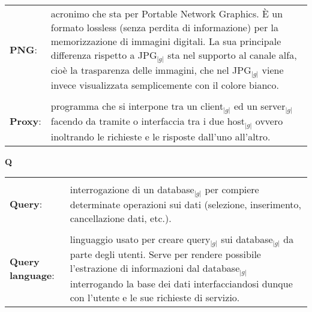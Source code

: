 \begin{longtable}{p{} p{}}
	    \\
	    \textbf{PNG}:		&	acronimo che sta per Portable Network Graphics. \`E un formato lossless (senza perdita di informazione) per la memorizzazione di immagini digitali. La sua principale differenza rispetto a JPG$_{|g|}$ sta 
						nel supporto al canale alfa, cioè la trasparenza delle immagini, che nel JPG$_{|g|}$ viene invece visualizzata semplicemente con il colore bianco.\\
	    \\
	    \textbf{Proxy}: 		&	programma che si interpone tra un client$_{|g|}$ ed un server$_{|g|}$ facendo da tramite o interfaccia tra i due host$_{|g|}$ ovvero inoltrando le richieste e le risposte dall’uno all’altro.\\
	\end{longtable}
\newpage


\hfill\Huge{\textbf{Q}}\\
\normalsize
	\begin{longtable}{p{} p{}} 
	    \toprule
	    \\
	    \textbf{Query}: 		&	interrogazione di un database$_{|g|}$ per compiere determinate operazioni sui dati (selezione, inserimento, cancellazione dati, etc.).\\
	    \\
	    \textbf{Query language}: 	&	linguaggio usato per creare query$_{|g|}$ sui database$_{|g|}$ da parte degli utenti. Serve per rendere possibile l'estrazione di informazioni dal database$_{|g|}$ interrogando la base dei dati interfacciandosi dunque con l'utente e le sue richieste di servizio.\\
	\end{longtable}
\newpage


